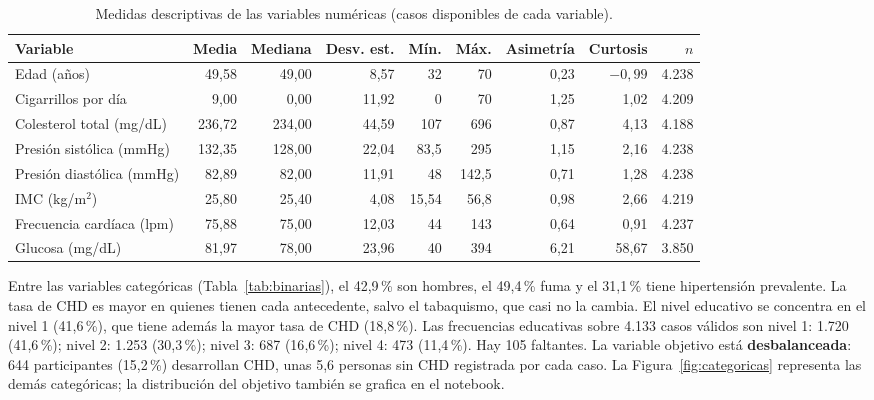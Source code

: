 \documentclass[11pt,a4paper]{article}
\begin{document}
\begin{table}[H]
\centering
\small
\caption{Medidas descriptivas de las variables numéricas (casos disponibles de cada variable).}
\label{tab:descriptivos}
\setlength{\tabcolsep}{2.2pt}
\begin{tabular}{lrrrrrrr@{\hspace{9pt}}r}
\toprule
\textbf{Variable} & \textbf{Media} & \textbf{Mediana} & \textbf{Desv. est.} & \textbf{Mín.} & \textbf{Máx.} & \textbf{Asimetría} & \textbf{Curtosis} & \textbf{$n$} \\
\midrule
Edad (años)                & 49{,}58  & 49{,}00  & 8{,}57  & 32       & 70       & 0{,}23 & $-0{,}99$ & 4.238 \\
Cigarrillos por día        & 9{,}00   & 0{,}00   & 11{,}92 & 0        & 70       & 1{,}25 & 1{,}02 & 4.209 \\
Colesterol total (mg/dL)   & 236{,}72 & 234{,}00 & 44{,}59 & 107      & 696      & 0{,}87 & 4{,}13 & 4.188 \\
Presión sistólica (mmHg)   & 132{,}35 & 128{,}00 & 22{,}04 & 83{,}5   & 295      & 1{,}15 & 2{,}16 & 4.238 \\
Presión diastólica (mmHg)  & 82{,}89  & 82{,}00  & 11{,}91 & 48       & 142{,}5  & 0{,}71 & 1{,}28 & 4.238 \\
IMC (kg/m$^2$)             & 25{,}80  & 25{,}40  & 4{,}08  & 15{,}54  & 56{,}8   & 0{,}98 & 2{,}66 & 4.219 \\
Frecuencia cardíaca (lpm)  & 75{,}88  & 75{,}00  & 12{,}03 & 44       & 143      & 0{,}64 & 0{,}91 & 4.237 \\
Glucosa (mg/dL)            & 81{,}97  & 78{,}00  & 23{,}96 & 40       & 394      & 6{,}21 & 58{,}67 & 3.850 \\
\bottomrule
\end{tabular}
\end{table}

Entre las variables categóricas (Tabla~\ref{tab:binarias}), el 42{,}9\,\% son hombres, el 49{,}4\,\% fuma
y el 31{,}1\,\% tiene hipertensión prevalente. La tasa de CHD es mayor en quienes tienen cada antecedente,
salvo el tabaquismo, que casi no la cambia. El nivel educativo se concentra en el nivel 1 (41{,}6\,\%), que
tiene además la mayor tasa de CHD (18{,}8\,\%). Las frecuencias educativas sobre 4.133 casos válidos son nivel 1: 1.720 (41{,}6\,\%); nivel 2: 1.253 (30{,}3\,\%); nivel 3: 687 (16{,}6\,\%); nivel 4: 473 (11{,}4\,\%). Hay 105 faltantes. La variable objetivo está \textbf{desbalanceada}: 644
participantes (15{,}2\,\%) desarrollan CHD, unas 5{,}6 personas sin CHD registrada por cada caso.
La Figura~\ref{fig:categoricas} representa las demás categóricas; la distribución del objetivo también se grafica en el notebook.
\end{document}
